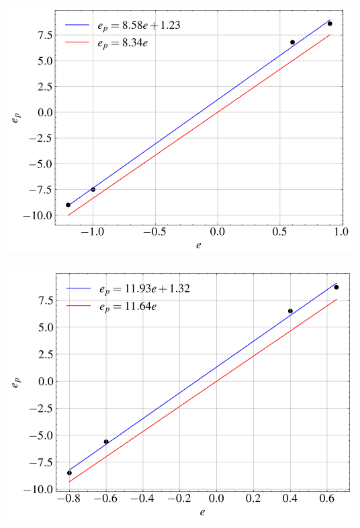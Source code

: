 \begin{figure}
	\centering
	\begin{subfigure}{0.45\linewidth}
		\centering
		\includegraphics[width=\linewidth]{src/figures/e-e_p-relation/e-e_p-relation-60.png}
		\label{fig:e-e_p-relation-60}
	\end{subfigure}
	\begin{subfigure}{0.45\linewidth}
		\centering
		\includegraphics[width=\linewidth]{src/figures/e-e_p-relation/e-e_p-relation-80.png}
		\label{fig:e-e_p-relation-80}
	\end{subfigure}
	\begin{subfigure}{0.45\linewidth}
		\centering

\end{subfigure}
\end{figure}
